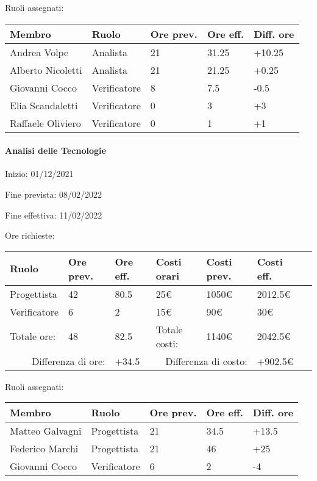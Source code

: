 \documentclass[a4paper, 12pt]{article}
\begin{document}
Ruoli assegnati:\\[0.5em]
\begin{tabular}{|l|l|l|l|l|}\hline
Membro & Ruolo & Ore prev. & Ore eff. & Diff. ore \\\hline
Andrea Volpe & Analista & 21 & 31.25  & +10.25 \\\hline
Alberto Nicoletti & Analista & 21 & 21.25 & +0.25 \\\hline
Giovanni Cocco & Verificatore & 8 & 7.5 & -0.5 \\\hline
Elia Scandaletti & Verificatore & 0 & 3 & +3 \\\hline
Raffaele Oliviero & Verificatore & 0 & 1 & +1 \\\hline
\end{tabular}

\paragraph{Analisi delle Tecnologie}
Inizio: 01/12/2021\par
Fine prevista: 08/02/2022\par
Fine effettiva: 11/02/2022

Ore richieste:\\[0.5em]
\begin{tabular}{|l|l|l||l|l|l|l|}\hline
Ruolo & Ore prev. & Ore eff. & Costi orari & Costi prev. & Costi eff.\\\hline
Progettista & 42 & 80.5 & 25\euro & 1050\euro & 2012.5\euro \\\hline
Verificatore & 6 & 2 & 15\euro & 90\euro & 30\euro \\\hline
Totale ore: & 48 & 82.5 & Totale costi: & 1140\euro & 2042.5\euro \\\hline
\multicolumn{2}{|r|}{Differenza di ore:} & +34.5 & \multicolumn{2}{r|}{Differenza di costo:} & +902.5\euro \\\hline
\end{tabular}

Ruoli assegnati:\\[0.5em]
\begin{tabular}{|l|l|l|l|l|}\hline
Membro & Ruolo & Ore prev. & Ore eff. & Diff. ore \\\hline
Matteo Galvagni & Progettista & 21 & 34.5 & +13.5 \\\hline
Federico Marchi & Progettista & 21 & 46 & +25 \\\hline
Giovanni Cocco & Verificatore & 6 & 2 & -4 \\\hline
\end{tabular}
\end{document}
